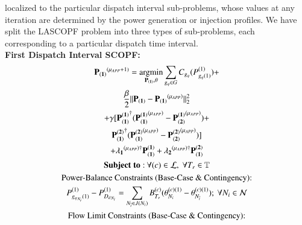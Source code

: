 \documentclass[preprint,12pt,3p]{elsarticle}
\begin{document}
localized to the particular dispatch interval sub-problems, whose values at any iteration are determined by the power generation or injection profiles. We have split the LASCOPF problem into three types of sub-problems, each corresponding to a particular dispatch time interval.\\
	\textbf{First Dispatch Interval SCOPF:}
	\begin{subequations}\label{Look-Ahead_General_First_Interval_Angle}
		\begin{gather}
		\mathbf{P_{(1)}}^{(\mu_{APP}+1)}=\argmin_{\mathbf{P_{(1)}},\theta} \sum_{{g_q}\in G}C_{g_q}(P_{{g_q}(1)}^{(1)})+\notag\\\frac{\beta}{2}||\mathbf{P_{(1)}}-\mathbf{P_{(1)}}^{(\mu_{APP})}||_2^2\notag\\+\gamma[\mathbf{P_{(1)}^{(1)}}^{\dagger}(\mathbf{P_{(1)}^{(1)}}^{(\mu_{APP})}-\mathbf{P_{(2)}^{(1)}}^{(\mu_{APP})})+\notag\\\mathbf{P_{(1)}^{(2)}}^{\dagger}(\mathbf{P_{(1)}^{(2)}}^{(\mu_{APP})}-\mathbf{P_{(2)}^{(2)}}^{(\mu_{APP})})]\notag\\+\mathbf{\lambda_1}^{(\mu_{APP})\dagger}\mathbf{P_{(1)}^{(1)}}+\mathbf{\lambda_2}^{(\mu_{APP})\dagger}\mathbf{P_{(1)}^{(2)}}\label{first_Look-Ahead_General_First_Interval_Angle}\\
		\mathbf{Subject\;to:}\:\forall(c)\in\mathcal{L},\;\forall T_r\in \mathbb{T}\notag\\
		\text{Power-Balance Constraints (Base-Case \& Contingency):}\notag\\
		P_{{g_q}_{N_i}(1)}^{(1)}-P_{{D_d}_{N_i}}^{(1)}=\sum_{N_{\overline{i}}\in{J(N_i)}}B_{T_r}^{(c)}(\theta_{N_i}^{(c)(1)}-\theta_{N_{\overline{i}}}^{(c)(1)});\ \forall{{N_i}\in\mathcal{N}}\label{secondA_Look-Ahead_General_First_Interval_Angle}\\
		\text{Flow Limit Constraints (Base-Case \& Contingency):}\notag\\

\end{gather}
\end{subequations}
\end{document}
